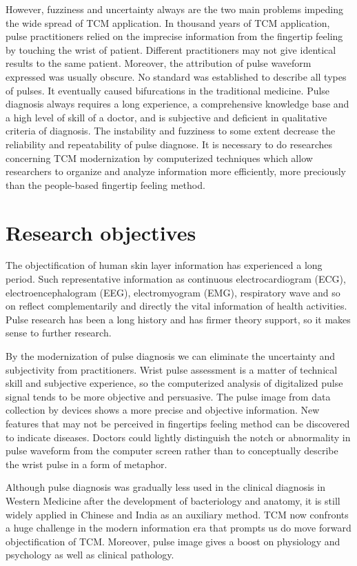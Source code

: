 However, fuzziness and uncertainty always are the two main problems impeding
the wide spread of TCM application. In thousand years of TCM
application, pulse practitioners relied on the imprecise information
from the fingertip feeling by touching the wrist of patient. Different
practitioners may not give identical results to the same patient.
Moreover, the attribution of pulse waveform expressed was usually
obscure. No standard was established to describe all types of pulses.
It eventually caused bifurcations in the traditional medicine. Pulse
diagnosis always requires a long experience, a comprehensive knowledge
base and a high level of skill of a doctor, and is subjective and
deficient in qualitative criteria of diagnosis. The instability and
fuzziness to some extent decrease the reliability and repeatability of
pulse diagnose. It is necessary to do researches concerning TCM
modernization by computerized techniques which allow researchers to
organize and analyze information more efficiently, more preciously
than the people-based fingertip feeling method. 



\section{Research objectives}
The objectification of human skin layer information has
experienced a long period. Such representative information as
continuous electrocardiogram (ECG), electroencephalogram (EEG),
electromyogram (EMG), respiratory wave and so on reflect
complementarily and directly the vital information of health
activities. Pulse research has been a long history and has firmer 
theory support, so it makes sense to further research. 

By the modernization of pulse diagnosis we can eliminate the
uncertainty and subjectivity from practitioners. Wrist pulse
assessment is a matter of technical skill and subjective experience,
\cite{hammer2001chinese} so the computerized analysis of digitalized pulse signal tends to
be more objective and persuasive.  The pulse 
image from data collection by devices shows a more precise and
objective information. New features that may not be perceived in
fingertips feeling method can be discovered to indicate diseases. 
Doctors could lightly distinguish the notch or abnormality in pulse
waveform from the computer screen rather than to conceptually describe
the wrist pulse in a form of metaphor. 

Although pulse diagnosis was gradually less used in the clinical
diagnosis in Western Medicine after the development of bacteriology
and anatomy, it is still widely applied in Chinese and India as an
auxiliary method. TCM now confronts a huge challenge in the modern
information era that prompts us do move forward objectification
of TCM. Moreover, pulse image gives a boost on physiology and
psychology as well as clinical pathology. 

